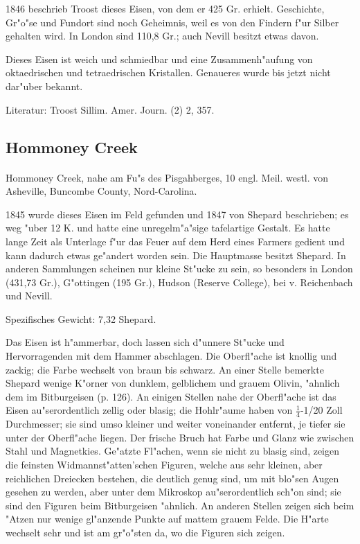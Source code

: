 \documentclass[a4paper, 11pt, oneside]{article}
\begin{document}
1846 beschrieb Troost dieses Eisen, von dem er 425 Gr. erhielt. Geschichte, Gr"o"se und Fundort sind noch Geheimnis, weil es von den Findern f"ur Silber gehalten wird. In London sind 110,8 Gr.; auch Nevill besitzt etwas davon.

Dieses Eisen ist weich und schmiedbar und eine Zusammenh"aufung von oktaedrischen und tetraedrischen Kristallen. Genaueres wurde bis jetzt nicht dar"uber bekannt.

\footnotesize
Literatur: Troost Sillim. Amer. Journ. (2) 2, 357.

\subsection{Hommoney Creek}
\normalsize
\paragraph{}
Hommoney Creek, nahe am Fu"s des Pisgahberges, 10 engl. Meil. westl. von Asheville, Buncombe County, Nord-Carolina.

1845 wurde dieses Eisen im Feld gefunden und 1847 von Shepard beschrieben; es weg "uber 12 K. und hatte eine unregelm"a"sige tafelartige Gestalt. Es hatte lange Zeit als Unterlage f"ur das Feuer auf dem Herd eines Farmers gedient und kann dadurch etwas ge"andert worden sein. Die Hauptmasse besitzt Shepard. In anderen Sammlungen scheinen nur kleine St"ucke zu sein, so besonders in London (431,73 Gr.), G"ottingen (195 Gr.), Hudson (Reserve College), bei v. Reichenbach und Nevill.

Spezifisches Gewicht: 7,32 Shepard.

Das Eisen ist h"ammerbar, doch lassen sich d"unnere St"ucke und Hervorragenden mit dem Hammer abschlagen. Die Oberfl"ache ist knollig und zackig; die Farbe wechselt von braun bis schwarz. An einer Stelle bemerkte Shepard wenige K"orner von dunklem, gelblichem und grauem Olivin, "ahnlich dem im Bitburgeisen (p. 126). An einigen Stellen nahe der Oberfl"ache ist das Eisen au"serordentlich zellig oder blasig; die Hohlr"aume haben von $\frac{1}{4}$-1/20 Zoll Durchmesser; sie sind umso kleiner und weiter voneinander entfernt, je tiefer sie unter der Oberfl"ache liegen. Der frische Bruch hat Farbe und Glanz wie zwischen Stahl und Magnetkies. Ge"atzte Fl"achen, wenn sie nicht zu blasig sind, zeigen die feinsten Widmannst"atten'schen Figuren, welche aus sehr kleinen, aber reichlichen Dreiecken bestehen, die deutlich genug sind, um mit blo"sen Augen gesehen zu werden, aber unter dem Mikroskop au"serordentlich sch"on sind; sie sind den Figuren beim Bitburgeisen "ahnlich. An anderen Stellen zeigen sich beim "Atzen nur wenige gl"anzende Punkte auf mattem grauem Felde. Die H"arte wechselt sehr und ist am gr"o"sten da, wo die Figuren sich zeigen.
\end{document}
